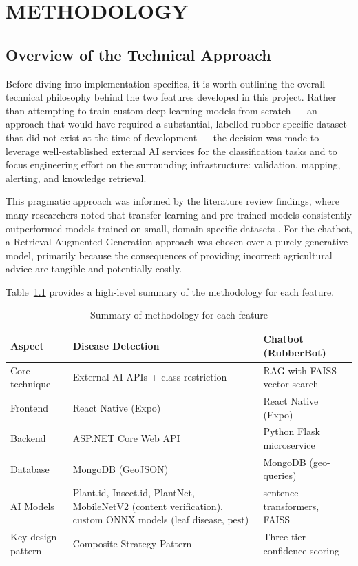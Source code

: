 \chapter{METHODOLOGY}

\section{Overview of the Technical Approach}

Before diving into implementation specifics, it is worth outlining the overall technical philosophy behind the two features developed in this project. Rather than attempting to train custom deep learning models from scratch --- an approach that would have required a substantial, labelled rubber-specific dataset that did not exist at the time of development --- the decision was made to leverage well-established external AI services for the classification tasks and to focus engineering effort on the surrounding infrastructure: validation, mapping, alerting, and knowledge retrieval.

This pragmatic approach was informed by the literature review findings, where many researchers noted that transfer learning and pre-trained models consistently outperformed models trained on small, domain-specific datasets \cite{ref8, ref10}. For the chatbot, a Retrieval-Augmented Generation approach was chosen over a purely generative model, primarily because the consequences of providing incorrect agricultural advice are tangible and potentially costly.

Table~\ref{tab:methodology_summary} provides a high-level summary of the methodology for each feature.

\begin{table}[H]
\centering
\caption{Summary of methodology for each feature}
\label{tab:methodology_summary}
\begin{tabularx}{\textwidth}{|l|X|X|}
\hline
\textbf{Aspect} & \textbf{Disease Detection} & \textbf{Chatbot (RubberBot)} \\
\hline
Core technique & External AI APIs + class restriction & RAG with FAISS vector search \\
\hline
Frontend & React Native (Expo) & React Native (Expo) \\
\hline
Backend & ASP.NET Core Web API & Python Flask microservice \\
\hline
Database & MongoDB (GeoJSON) & MongoDB (geo-queries) \\
\hline
AI Models & Plant.id, Insect.id, PlantNet, MobileNetV2 (content verification), custom ONNX models (leaf disease, pest) & sentence-transformers, FAISS \\
\hline
Key design pattern & Composite Strategy Pattern & Three-tier confidence scoring \\
\hline
\end{tabularx}
\end{table}


